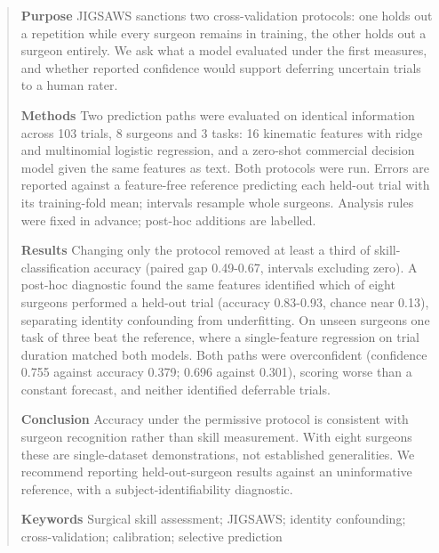 \begin{abstract}
\textbf{Purpose} JIGSAWS sanctions two cross-validation protocols: one holds out a repetition while every surgeon remains in training, the other holds out a surgeon entirely. We ask what a model evaluated under the first measures, and whether reported confidence would support deferring uncertain trials to a human rater.

\textbf{Methods} Two prediction paths were evaluated on identical information across 103 trials, 8 surgeons and 3 tasks: 16 kinematic features with ridge and multinomial logistic regression, and a zero-shot commercial decision model given the same features as text. Both protocols were run. Errors are reported against a feature-free reference predicting each held-out trial with its training-fold mean; intervals resample whole surgeons. Analysis rules were fixed in advance; post-hoc additions are labelled.

\textbf{Results} Changing only the protocol removed at least a third of skill-classification accuracy (paired gap 0.49-0.67, intervals excluding zero). A post-hoc diagnostic found the same features identified which of eight surgeons performed a held-out trial (accuracy 0.83-0.93, chance near 0.13), separating identity confounding from underfitting. On unseen surgeons one task of three beat the reference, where a single-feature regression on trial duration matched both models. Both paths were overconfident (confidence 0.755 against accuracy 0.379; 0.696 against 0.301), scoring worse than a constant forecast, and neither identified deferrable trials.

\textbf{Conclusion} Accuracy under the permissive protocol is consistent with surgeon recognition rather than skill measurement. With eight surgeons these are single-dataset demonstrations, not established generalities. We recommend reporting held-out-surgeon results against an uninformative reference, with a subject-identifiability diagnostic.

\textbf{Keywords} Surgical skill assessment; JIGSAWS; identity confounding; cross-validation; calibration; selective prediction

\end{abstract}

